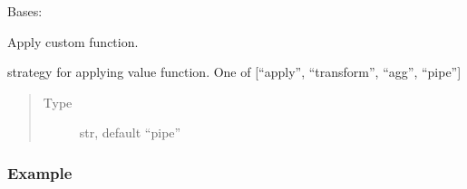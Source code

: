 \documentclass[letterpaper,10pt,english]{sphinxmanual}
\begin{document}
\begin{fulllineitems}
\label{\detokenize{dalio.pipe:dalio.pipe.Custom}}
Bases: {\hyperref[\detokenize{beginners-guide:dalio.pipe.col_generation._ColGeneration}]{}}

Apply custom function.

\begin{fulllineitems}
\label{\detokenize{dalio.pipe:dalio.pipe.Custom.strategy}}
strategy for applying value function.
One of {[}“apply”, “transform”, “agg”, “pipe”{]}
\begin{quote}\begin{description}
\item[{Type}] \leavevmode
str, default “pipe”

\end{description}\end{quote}

\end{fulllineitems}

\subsubsection*{Example}


\end{fulllineitems}
\end{document}
